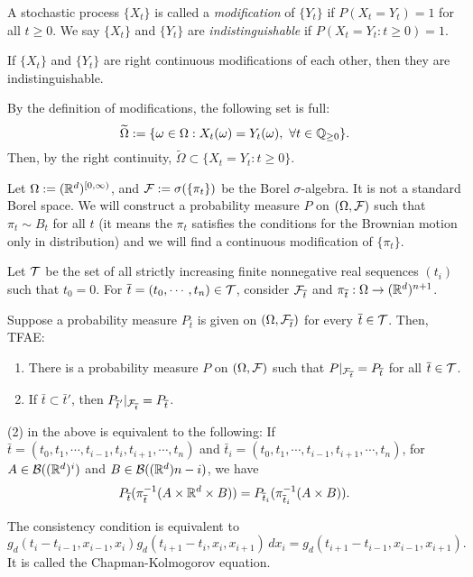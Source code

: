 \documentclass{../../../small}
\begin{document}
\begin{defn}[Modification]
A stochastic process $\{X_t\}$ is called a \emph{modification} of $\{Y_t\}$ if $P(X_t=Y_t)=1$ for all $t\ge0$.
We say $\{X_t\}$ and $\{Y_t\}$ are \emph{indistinguishable} if $P(X_t=Y_t:t\ge0)=1$.
\end{defn}
\begin{prop}
If $\{X_t\}$ and $\{Y_t\}$ are right continuous modifications of each other, then they are indistinguishable.
\end{prop}
\begin{pf}
By the definition of modifications, the following set is full:
\[\tilde\Omega:=\{\omega\in\Omega:X_t(\omega)=Y_t(\omega),\ \forall t\in\Q_{\ge0}\}.\]
Then, by the right continuity, $\tilde\Omega\subset\{X_t=Y_t:t\ge0\}$.
\end{pf}

Let $\Omega:=(\mathbb{R}^d)^{[0,\infty)}$, and $\mathcal{F}:=\sigma(\{\pi_t\})$ be the Borel $\sigma$-algebra.
It is not a standard Borel space.
We will construct a probability measure $P$ on $(\Omega,\mathcal{F})$ such that $\pi_t\sim B_t$ for all $t$ (it means the $\pi_t$ satisfies the conditions for the Brownian motion only in distribution) and we will find a continuous modification of $\{\pi_t\}$.

Let $\mathcal{T}$ be the set of all strictly increasing finite nonnegative real sequences $(t_i)$ such that $t_0=0$.
For $\overline t=(t_0,\cdots,t_n)\in\mathcal{T}$, consider $\mathcal{F}_{\overline t}$ and $\pi_{\overline t}:\Omega\to(\mathbb{R}^d)^{n+1}$.
\begin{thm}
Suppose a probability measure $P_{\bar t}$ is given on $(\Omega,\mathcal{F}_{\overline t})$ for every $\overline t\in\mathcal{T}$.
Then, TFAE:
\begin{enumerate}[(1)]
\item There is a probability measure $P$ on $(\Omega,\mathcal{F})$ such that $P|_{\mathcal{F}_{\overline t}}=P_{\overline t}$ for all $\overline t\in\mathcal{T}$.
\item If $\bar t\subset\bar t'$, then $P_{\overline t'}|_{\mathcal{F}_{\overline t}}=P_{\overline t}$.
\end{enumerate}
\end{thm}
\begin{rmk*}
(2) in the above is equivalent to the following:
If $\bar t=(t_0,t_1,\cdots,t_{i-1},t_i,t_{i+1},\cdots,t_n)$ and $\bar t_i=(t_0,t_1,\cdots,t_{i-1},t_{i+1},\cdots,t_n)$, for $A\in\mathcal{B}((\mathbb{R}^d)^i)$ and $B\in\mathcal{B}((\mathbb{R}^d){n-i})$, we have
\[P_{\overline t}(\pi_{\overline t}^{-1}(A\times\mathbb{R}^d\times B))=P_{\overline t_i}(\pi_{\overline t_i}^{-1}(A\times B)).\]
\end{rmk*}
\begin{rmk*}
The consistency condition is equivalent to
\[g_d(t_i-t_{i-1},x_{i-1},x_i)g_d(t_{i+1}-t_i,x_i,x_{i+1})\,dx_i=g_d(t_{i+1}-t_{i-1},x_{i-1},x_{i+1}).\]
It is called the Chapman-Kolmogorov equation.
\end{rmk*}
\end{document}
